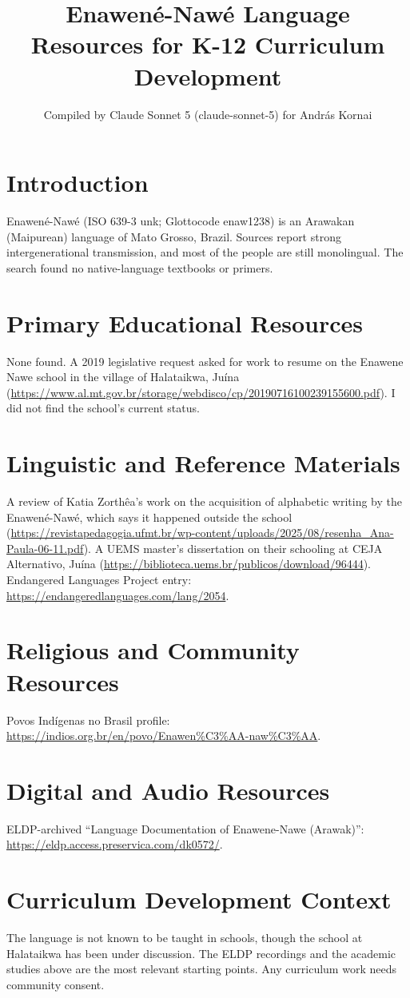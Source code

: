 \documentclass[12pt]{article}
\title{Enawen\'e-Naw\'e Language Resources for K-12 Curriculum Development}
\author{Compiled by Claude Sonnet 5 (claude-sonnet-5) for Andr\'as Kornai}
\date{}
\begin{document}
\maketitle
\section{Introduction}
Enawen\'e-Naw\'e (ISO 639-3 unk; Glottocode enaw1238) is an Arawakan (Maipurean) language of Mato Grosso, Brazil. Sources report strong intergenerational transmission, and most of the people are still monolingual. The search found no native-language textbooks or primers.
\section{Primary Educational Resources}
None found. A 2019 legislative request asked for work to resume on the Enawene Nawe school in the village of Halataikwa, Ju\'ina (\url{https://www.al.mt.gov.br/storage/webdisco/cp/20190716100239155600.pdf}). I did not find the school's current status.
\section{Linguistic and Reference Materials}
A review of Katia Zorth\^ea's work on the acquisition of alphabetic writing by the Enawen\'e-Naw\'e, which says it happened outside the school (\url{https://revistapedagogia.ufmt.br/wp-content/uploads/2025/08/resenha_Ana-Paula-06-11.pdf}). A UEMS master's dissertation on their schooling at CEJA Alternativo, Ju\'ina (\url{https://biblioteca.uems.br/publicos/download/96444}). Endangered Languages Project entry: \url{https://endangeredlanguages.com/lang/2054}.
\section{Religious and Community Resources}
Povos Ind\'igenas no Brasil profile: \url{https://indios.org.br/en/povo/Enawen\%C3\%AA-naw\%C3\%AA}.
\section{Digital and Audio Resources}
ELDP-archived ``Language Documentation of Enawene-Nawe (Arawak)'': \url{https://eldp.access.preservica.com/dk0572/}.
\section{Curriculum Development Context}
The language is not known to be taught in schools, though the school at Halataikwa has been under discussion. The ELDP recordings and the academic studies above are the most relevant starting points. Any curriculum work needs community consent.
\end{document}
